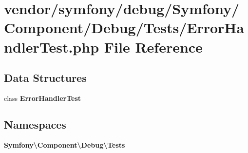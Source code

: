 \section{vendor/symfony/debug/\+Symfony/\+Component/\+Debug/\+Tests/\+Error\+Handler\+Test.php File Reference}
\label{symfony_2debug_2_symfony_2_component_2_debug_2_tests_2_error_handler_test_8php}
\subsection*{Data Structures}
\begin{DoxyCompactItemize}
\item 
class {\bf Error\+Handler\+Test}
\end{DoxyCompactItemize}
\subsection*{Namespaces}
\begin{DoxyCompactItemize}
\item 
 {\bf Symfony\textbackslash{}\+Component\textbackslash{}\+Debug\textbackslash{}\+Tests}
\end{DoxyCompactItemize}
